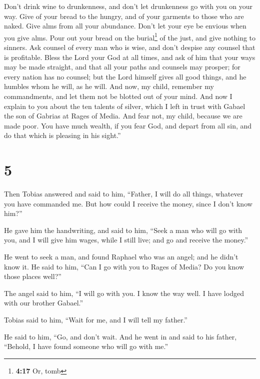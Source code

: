 Don't drink wine to drunkenness, and don't let drunkenness go with you
on your way.  Give of your bread to the hungry, and of
your garments to those who are naked. Give alms from all your abundance.
Don't let your eye be envious when you give alms.  Pour
out your bread on the burial\footnote{\textbf{4:17} Or, tomb} of the
just, and give nothing to sinners.  Ask counsel of every
man who is wise, and don't despise any counsel that is profitable.
 Bless the Lord your God at all times, and ask of him
that your ways may be made straight, and that all your paths and
counsels may prosper; for every nation has no counsel; but the Lord
himself gives all good things, and he humbles whom he will, as he will.
And now, my child, remember my commandments, and let them not be blotted
out of your mind.  And now I explain to you about the ten
talents of silver, which I left in trust with Gabael the son of Gabrias
at Rages of Media.  And fear not, my child, because we
are made poor. You have much wealth, if you fear God, and depart from
all sin, and do that which is pleasing in his sight.''

\hypertarget{section-4}{%
\section{5}\label{section-4}}

 Then Tobias answered and said to him, ``Father, I will do
all things, whatever you have commanded me.  But how could
I receive the money, since I don't know him?''

 He gave him the handwriting, and said to him, ``Seek a
man who will go with you, and I will give him wages, while I still live;
and go and receive the money.''

 He went to seek a man, and found Raphael who was an
angel;  and he didn't know it. He said to him, ``Can I go
with you to Rages of Media? Do you know those places well?''

 The angel said to him, ``I will go with you. I know the
way well. I have lodged with our brother Gabael.''

 Tobias said to him, ``Wait for me, and I will tell my
father.''

 He said to him, ``Go, and don't wait. And he went in and
said to his father, ``Behold, I have found someone who will go with
me.''

